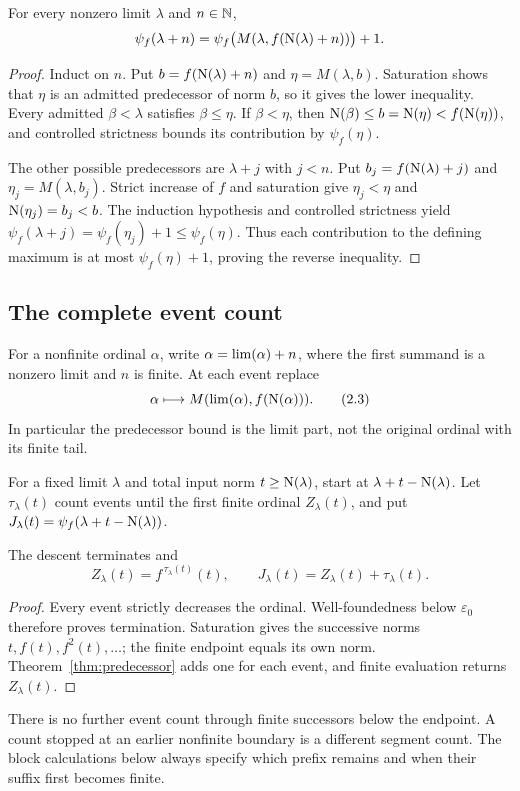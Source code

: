 \begin{theorem}\label{thm:predecessor}
For every nonzero limit $\lambda$ and $n\in\mathbb N$,
\[
 \psi_f(\lambda+n)
 =\psi_f\bigl(M(\lambda,f(\operatorname{N}(\lambda)+n))\bigr)+1.
\]
\end{theorem}
\begin{proof}
Induct on $n$. Put $b=f(\operatorname{N}(\lambda)+n)$ and
$\eta=M(\lambda,b)$. Saturation shows that $\eta$ is an admitted
predecessor of norm $b$, so it gives the lower inequality.
Every admitted $\beta<\lambda$ satisfies $\beta\le\eta$.
If $\beta<\eta$, then
$\operatorname{N}(\beta)\le b=\operatorname{N}(\eta)<f(\operatorname{N}(\eta))$,
and controlled strictness bounds its contribution by
$\psi_f(\eta)$.

The other possible predecessors are $\lambda+j$ with $j<n$.
Put $b_j=f(\operatorname{N}(\lambda)+j)$ and
$\eta_j=M(\lambda,b_j)$. Strict increase of $f$ and saturation
give $\eta_j<\eta$ and $\operatorname{N}(\eta_j)=b_j<b$.
The induction hypothesis and controlled strictness yield
$\psi_f(\lambda+j)=\psi_f(\eta_j)+1\le\psi_f(\eta)$.
Thus each contribution to the defining maximum is at most
$\psi_f(\eta)+1$, proving the reverse inequality.
\end{proof}

\subsection{The complete event count}
For a nonfinite ordinal $\alpha$, write
$\alpha=\operatorname{lim}(\alpha)+n$, where the first summand is a
nonzero limit and $n$ is finite. At each event replace
\[
 \alpha\longmapsto M(\operatorname{lim}(\alpha),f(\operatorname{N}(\alpha))).
 \tag{2.3}
\]
In particular the predecessor bound is the limit part, not the
original ordinal with its finite tail.

For a fixed limit $\lambda$ and total input norm
$t\ge\operatorname{N}(\lambda)$, start at $\lambda+t-\operatorname{N}(\lambda)$.
Let $\tau_\lambda(t)$ count events until the first finite
ordinal $Z_\lambda(t)$, and put
$J_\lambda(t)=\psi_f(\lambda+t-\operatorname{N}(\lambda))$.

\begin{proposition}\label{prop:complete}
The descent terminates and
\[
 Z_\lambda(t)=f^{\,\tau_\lambda(t)}(t),\qquad
 J_\lambda(t)=Z_\lambda(t)+\tau_\lambda(t).
\]
\end{proposition}
\begin{proof}
Every event strictly decreases the ordinal. Well-foundedness below
$\varepsilon_0$ therefore proves termination. Saturation gives the
successive norms $t,f(t),f^2(t),\ldots$; the finite endpoint equals
its own norm. Theorem~\ref{thm:predecessor} adds one for each
event, and finite evaluation returns $Z_\lambda(t)$.
\end{proof}

There is no further event count through finite successors below the
endpoint. A count stopped at an earlier nonfinite boundary is a
different segment count. The block calculations below always specify
which prefix remains and when their suffix first becomes finite.
